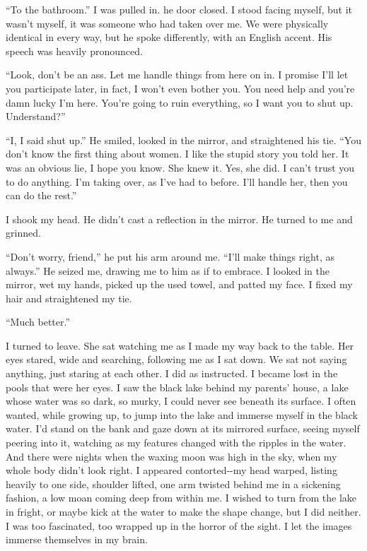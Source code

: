 ``To the bathroom.'' I was pulled in. he door closed. I stood facing
myself, but it wasn't myself, it was someone who had taken over me. We
were physically identical in every way, but he spoke differently, with
an English accent. His speech was heavily pronounced.

``Look, don't be an ass. Let me handle things from here on in. I promise
I'll let you participate later, in fact, I won't even bother you. You
need help and you're damn lucky I'm here. You're going to ruin
everything, so I want you to shut up. Understand?''

``I, I said shut up.'' He smiled, looked in the mirror, and straightened
his tie. ``You don't know the first thing about women. I like the stupid
story you told her. It was an obvious lie, I hope you know. She knew it.
Yes, she did. I can't trust you to do anything. I'm taking over, as I've
had to before. I'll handle her, then you can do the rest.''

I shook my head. He didn't cast a reflection in the mirror. He turned to
me and grinned.

``Don't worry, friend,'' he put his arm around me. ``I'll make things
right, as always.'' He seized me, drawing me to him as if to embrace. I
looked in the mirror, wet my hands, picked up the used towel, and patted
my face. I fixed my hair and straightened my tie.

``Much better.''

I turned to leave. She sat watching me as I made my way back to the
table. Her eyes stared, wide and searching, following me as I sat down.
We sat not saying anything, just staring at each other. I did as
instructed. I became lost in the pools that were her eyes. I saw the
black lake behind my parents' house, a lake whose water was so dark, so
murky, I could never see beneath its surface. I often wanted, while
growing up, to jump into the lake and immerse myself in the black water.
I'd stand on the bank and gaze down at its mirrored surface, seeing
myself peering into it, watching as my features changed with the ripples
in the water. And there were nights when the waxing moon was high in the
sky, when my whole body didn't look right. I appeared contorted-\/-my
head warped, listing heavily to one side, shoulder lifted, one arm
twisted behind me in a sickening fashion, a low moan coming deep from
within me. I wished to turn from the lake in fright, or maybe kick at
the water to make the shape change, but I did neither. I was too
fascinated, too wrapped up in the horror of the sight. I let the images
immerse themselves in my brain.

